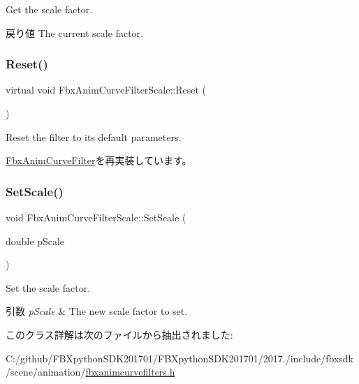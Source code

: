 Get the scale factor. \begin{DoxyReturn}{戻り値}
The current scale factor. 
\end{DoxyReturn}
\mbox{\label{class_fbx_anim_curve_filter_scale_a40e82207d205b026aaab40e52a7184c8}} 
\subsubsection{\texorpdfstring{Reset()}{Reset()}}
{\footnotesize\ttfamily virtual void Fbx\+Anim\+Curve\+Filter\+Scale\+::\+Reset (\begin{DoxyParamCaption}{ }\end{DoxyParamCaption})\hspace{0.3cm}{\ttfamily [virtual]}}

Reset the filter to its default parameters. 

\hyperlink{class_fbx_anim_curve_filter_a57fb35baaaa85adb08946383cf40e811}{Fbx\+Anim\+Curve\+Filter}を再実装しています。

\mbox{\label{class_fbx_anim_curve_filter_scale_a9c564c7599541607c42d28bb57874eae}} 
\subsubsection{\texorpdfstring{Set\+Scale()}{SetScale()}}
{\footnotesize\ttfamily void Fbx\+Anim\+Curve\+Filter\+Scale\+::\+Set\+Scale (\begin{DoxyParamCaption}\item[{double}]{p\+Scale }\end{DoxyParamCaption})}

Set the scale factor. 
\begin{DoxyParams}{引数}
{\em p\+Scale} & The new scale factor to set. \\
\hline
\end{DoxyParams}


このクラス詳解は次のファイルから抽出されました\+:\begin{DoxyCompactItemize}
\item 
C\+:/github/\+F\+B\+Xpython\+S\+D\+K201701/\+F\+B\+Xpython\+S\+D\+K201701/2017./include/fbxsdk/scene/animation/\hyperlink{fbxanimcurvefilters_8h}{fbxanimcurvefilters.\+h}\end{DoxyCompactItemize}
